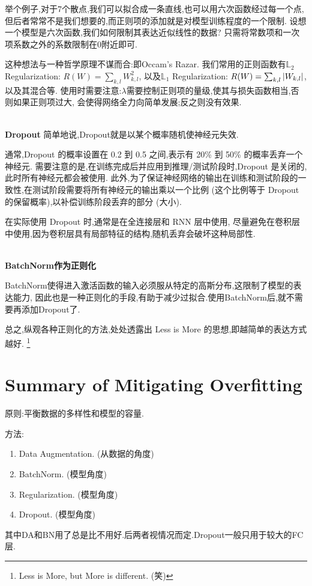 举个例子,对于7个散点,我们可以拟合成一条直线,也可以用六次函数经过每一个点,
但后者常常不是我们想要的,而正则项的添加就是对模型训练程度的一个限制.
设想一个模型是六次函数,我们如何限制其表达近似线性的数据?
只需将常数项和一次项系数之外的系数限制在0附近即可.

这种想法与一种哲学原理不谋而合:即Occam's Razar.
我们常用的正则函数有$\mathbb L_2$ Regularization: $R(W) = \sum_{k,l}W_{k, l}^2$,
以及$\mathbb L_1$ Regularization: $R(W) = \sum_{k,l}\left|W_{k, l} \right|$,以及其混合等.
使用时需要注意:$\lambda$需要控制正则项的量级,使其与损失函数相当,否则如果正则项过大,
会使得网络全力向简单发展;反之则没有效果.

\textbf{\\Dropout}
简单地说,Dropout就是以某个概率随机使神经元失效.

通常,Dropout 的概率设置在 0.2 到 0.5 之间,表示有 20\% 到 50\% 的概率丢弃一个神经元.
需要注意的是,在训练完成后并应用到推理/测试阶段时,Dropout 是关闭的,此时所有神经元都会被使用.
此外,为了保证神经网络的输出在训练和测试阶段的一致性,在测试阶段需要将所有神经元的输出乘以一个比例
(这个比例等于 Dropout 的保留概率),以补偿训练阶段丢弃的部分 (大小).

在实际使用 Dropout 时,通常是在全连接层和 RNN 层中使用,
尽量避免在卷积层中使用,因为卷积层具有局部特征的结构,随机丢弃会破坏这种局部性.

\textbf{\\BatchNorm作为正则化}

BatchNorm使得进入激活函数的输入必须服从特定的高斯分布,这限制了模型的表达能力,
因此也是一种正则化的手段,有助于减少过拟合.使用BatchNorm后,就不需要再添加Dropout了.

总之,纵观各种正则化的方法,处处透露出 Less is More 的思想,即越简单的表达方式越好.
\footnote{Less is More, but More is different. (笑)}

\section{Summary of Mitigating Overfitting}
原则:平衡数据的多样性和模型的容量.

方法:
\begin{enumerate}
	\item Data Augmentation. (从数据的角度)
	\item BatchNorm. (模型角度)
	\item Regularization. (模型角度)
	\item Dropout. (模型角度)
\end{enumerate}

其中DA和BN用了总是比不用好.后两者视情况而定.Dropout一般只用于较大的FC层.